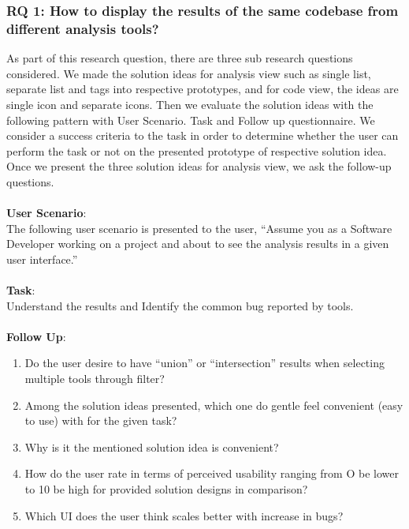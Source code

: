 \subsubsection{RQ 1: How to display the results of the same codebase from different analysis tools?}

As part of this research question, there are three sub research questions considered. We made the solution ideas for analysis view such as single list, separate list and tags into respective prototypes, and for code view, the ideas are single icon and separate icons. Then we evaluate the solution ideas with the following pattern with User Scenario. Task and Follow up questionnaire. We consider a success criteria to the task in order to determine whether the user can perform the task or not on the presented prototype of respective solution idea. Once we present the three solution ideas for analysis view, we ask the follow-up questions. \\ \\

\textbf{User Scenario}: \\

The following user scenario is presented to the user, “Assume you as a Software Developer working on a project and about to see the analysis results in a given user interface.” \\ \\

\textbf{Task}: \\

Understand the results and Identify the common bug reported by tools. \\ \\

\textbf{Follow Up}: \\

\begin{enumerate}
\item Do the user desire to have “union” or “intersection” results when selecting multiple tools through filter? 
\item Among the solution ideas presented, which one do gentle feel convenient (easy to use) with for the given task?
\item Why is it the mentioned solution idea is convenient?
\item How do the user rate in terms of perceived usability ranging from O be lower to 10 be high for provided solution designs in comparison?
\item Which UI does the user think scales better with increase in bugs? \\
\end{enumerate}

